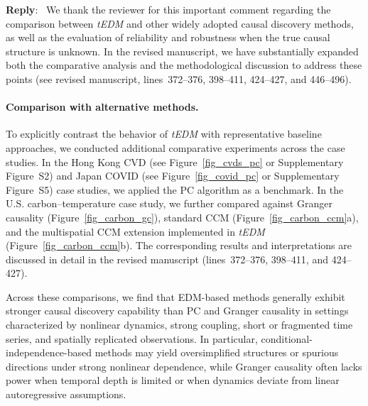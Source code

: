 \documentclass[11pt]{article}
\newcounter{reviewer}
\newcounter{point}[reviewer]
\newenvironment{reply}
   {\medskip \noindent \color{blue} \begin{sf}\textbf{Reply}:\  }
   {\medskip \par \end{sf}}
\begin{document}
\begin{reply}
We thank the reviewer for this important comment regarding the comparison between \textit{tEDM} and other widely adopted causal discovery methods, as well as the evaluation of reliability and robustness when the true causal structure is unknown. In the revised manuscript, we have substantially expanded both the comparative analysis and the methodological discussion to address these points (see revised manuscript, lines~372--376, 398--411, 424--427, and 446--496).

\paragraph{Comparison with alternative methods.}
To explicitly contrast the behavior of \textit{tEDM} with representative baseline approaches, we conducted additional comparative experiments across the case studies. In the Hong Kong CVD (see Figure~\ref{fig_cvds_pc} or Supplementary Figure~S2) and Japan COVID (see Figure~\ref{fig_covid_pc} or Supplementary Figure~S5) case studies, we applied the PC algorithm as a benchmark. In the U.S. carbon--temperature case study, we further compared against Granger causality (Figure~\ref{fig_carbon_gc}), standard CCM (Figure~\ref{fig_carbon_ccm}a), and the multispatial CCM extension implemented in \textit{tEDM} (Figure~\ref{fig_carbon_ccm}b). The corresponding results and interpretations are discussed in detail in the revised manuscript (lines~372--376, 398--411, and 424--427).

Across these comparisons, we find that EDM-based methods generally exhibit stronger causal discovery capability than PC and Granger causality in settings characterized by nonlinear dynamics, strong coupling, short or fragmented time series, and spatially replicated observations. In particular, conditional-independence-based methods may yield oversimplified structures or spurious directions under strong nonlinear dependence, while Granger causality often lacks power when temporal depth is limited or when dynamics deviate from linear autoregressive assumptions.


\end{reply}
\end{document}
